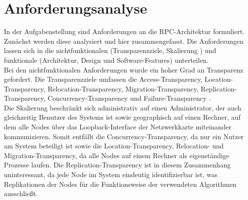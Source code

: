%
\chapter{Anforderungsanalyse}

In der Aufgabenstellung sind Anforderungen an die RPC-Architektur formuliert.
Zunächst werden diese analysiert und hier zusammengefasst.
Die Anforderungen lassen sich in die nichtfunktionalen (Transparenzziele, Skalierung \cite{tanenbaumvansteen}) und funktionale (Architektur, Design und Software-Features) unterteilen.\\
Bei den nichtfunktionalen Anforderungen wurde ein hoher Grad an Transparenz gefordert.
Die Transparenzziele umfassen die Access-Transparency, Location-Transparency, Relocation-Transparency,
Migration-Transparency, Replication-Transparency, Concurrency-Transparency und Failure-Transparency \citep{tanenbaumvansteen}.\\
Die Skalierung beschränkt sich administrativ auf einen Administrator, der auch gleichzeitig
Benutzer des Systems ist sowie geographisch auf einen Rechner, auf dem alle Nodes 
\citep{tanenbaumvansteen} über das Loopback-Interface der Netzwerkkarte miteinander kommunizieren.
Somit entfällt die Concurrency-Transparency, da nur ein Nutzer am System beteiligt ist sowie die
Location-Transparency, Relocation- und Migration-Transparency, da alle Nodes auf einem Rechner
als eigenständige Prozesse laufen. Die Replication-Transparency ist in diesem Zusammenhang uninteressant,
da jede Node im System eindeutig identifizierbar ist, was Replikationen der Nodes für die
Funktionsweise der verwendeten Algorithmen ausschließt.

